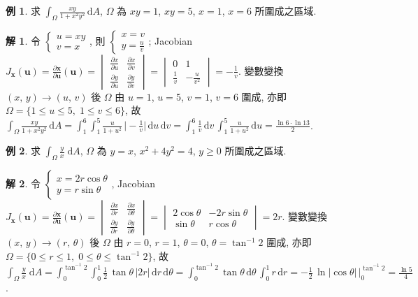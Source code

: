 \documentclass[12pt]{extarticle}
\newcommand{\ds}{\displaystyle}
\theoremstyle{definition}
\newtheorem*{ex}{例}
\newtheorem*{sol}{解}
\newcommand{\vu}{\mathbf{u}}
\newcommand{\vx}{\mathbf{x}}
\begin{document}
\begin{ex}
  求 $\ds\int_\Omega\frac{xy}{1 + x^2y^2}\,\text{d}A$, $\Omega$ 為 $xy = 1$, $xy = 5$, $x = 1$, $x = 6$ 所圍成之區域. 
\end{ex}

\begin{sol}
  令 $\ds\begin{cases}u = xy \\ v = x\end{cases}\!\!\!\!\!$, 則 $\ds\begin{cases}x = v \\ y = \frac{u}{v} \end{cases}\!\!\!\!\!$; Jacobian $\ds J_{\vx}(\vu) = \frac{\partial\vx}{\partial\vu}(\vu) = \begin{vmatrix}\frac{\partial x}{\partial u} & \frac{\partial x}{\partial v} \\ \frac{\partial y}{\partial u}& \frac{\partial y}{\partial v}\end{vmatrix} = \begin{vmatrix} 0 & 1\\ \frac{1}{v} & -\frac{u}{v^2}\end{vmatrix} = -\frac{1}{v}$. 變數變換 $(x,\,y)\to(u,\,v)$ 後 $\Omega$ 由 $u = 1$, $u = 5$, $v = 1$, $v = 6$ 圍成, 亦即 $\Omega = \{1\leqslant u\leqslant 5,\;1\leqslant v\leqslant 6\}$, 故 $\ds\int_\Omega\!\frac{xy}{1 + x^2y^2}\,\text{d}A = \int_1^6\!\int_1^5\frac{u}{1 + u^2}\,\bigg|-\frac{1}{v}\bigg|\,\text{d}u\,\text{d}v = \int_1^6\!\frac{1}{v}\,\text{d}v\,\int_1^5\frac{u}{1 + u^2}\,\text{d}u = \frac{\ln 6\cdot\ln 13}{2}$.
\end{sol}

\begin{ex}
  求 $\ds\int_\Omega\frac{y}{x}\;\text{d}A$, $\Omega$ 為 $y = x$, $x^2 + 4y^2 = 4$, $y \geqslant 0$ 所圍成之區域. 
\end{ex}

\begin{sol}
  令 $\ds\begin{cases}x = 2r\cos\theta \\ y = r\sin\theta \end{cases}\!\!\!\!\!$, Jacobian $\ds J_{\vx}(\vu) = \frac{\partial\vx}{\partial\vu}(\vu) = \begin{vmatrix}\frac{\partial x}{\partial r} & \frac{\partial x}{\partial\theta} \\ \frac{\partial y}{\partial r}& \frac{\partial y}{\partial\theta}\end{vmatrix} = \begin{vmatrix} 2\cos\theta & -2r\sin\theta\\ \sin\theta & r\cos\theta\end{vmatrix} = 2r$. 變數變換 $(x,\,y)\to(r,\,\theta)$ 後 $\Omega$ 由 $r = 0$, $r = 1$, $\theta = 0$, $\ds\theta = \tan^{-1}2$ 圍成, 亦即 $\Omega = \{0\leqslant r\leqslant 1,\;0\leqslant\theta\leqslant\tan^{-1}2\}$, 故 $\ds\int_\Omega\!\frac{y}{x}\;\text{d}A = \int_0^{\tan^{-1}2}\!\!\!\int_0^1\!\frac{1}{2}\,\tan\theta\,\big|2r\big|\,\text{d}r\,\text{d}\theta = \int_0^{\tan^{-1}2}\!\!\!\!\!\!\tan\theta\,\text{d}\theta\,\int_0^1 r\,\text{d}r = -\frac{1}{2}\,\ln|\cos\theta|\,\bigg|_0^{\tan^{-1}2} = \frac{\ln 5}{4}$.
\end{sol}
\end{document}
